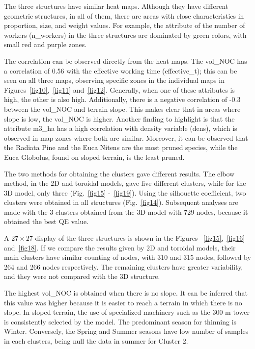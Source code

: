 \documentclass[conference]{IEEEtran}
\begin{document}
The three structures have similar heat maps. Although they have different geometric structures, in all of them, there are areas with close characteristics in proportion, size, and weight values. For example, the attribute of the number of workers (n\_workers) in the three structures are dominated by green colors, with small red and purple zones.

The correlation can be observed directly from the heat maps. The vol\_NOC has a correlation of 0.56 with the effective working time (effective\_t); this can be seen on all three maps, observing specific zones in the individual maps in Figures~\ref{fig10},~\ref{fig11} and~\ref{fig12}. Generally, when one of these attributes is high, the other is also high. Additionally, there is a negative correlation of -0.3 between the vol\_NOC and terrain slope. This makes clear that in areas where slope is low, the vol\_NOC is higher. Another finding to highlight is that the attribute m3\_ha has a high correlation with density variable (dens), which is observed in map zones where both are similar. Moreover, it can be observed that the Radiata Pine and the Euca Nitens are the most pruned species, while the Euca Globolus, found on sloped terrain, is the least pruned.

The two methods for obtaining the clusters gave different results. The elbow method, in the 2D and toroidal models, gave five different clusters, while for the 3D model, only three (Fig.~\ref{fig15} -~\ref{fig19}). Using the silhouette coefficient, two clusters were obtained in all structures (Fig.~\ref{fig14}). Subsequent analyses are made with the 3 clusters obtained from the 3D model with 729 nodes, because it obtained the best QE value.

A $27\times27$ display of the three structures is shown in the Figures ~\ref{fig15},~\ref{fig16} and~\ref{fig18}. If we compare the results given by 2D and toroidal models, their main clusters have similar counting of nodes, with 310 and 315 nodes, followed by 264 and 266 nodes respectively. The remaining clusters have greater variability, and they were not compared with the 3D structure.

The highest vol\_NOC is obtained when there is no slope. It can be inferred that this value was higher because it is easier to reach a terrain in which there is no slope. In sloped terrain, the use of specialized machinery such as the 300 m tower is consistently selected by the model. The predominant season for thinning is Winter. Conversely, the Spring and Summer seasons have low number of samples in each clusters, being null the data in summer for Cluster 2.
\end{document}
